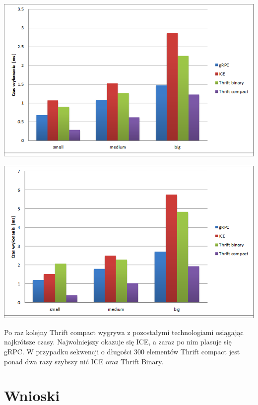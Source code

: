 \documentclass[12pt]{article}
\begin{document}
\begin{center}
\centering
    \includegraphics{lan_seq100.png}
\end{center}
\begin{center}
\centering
    \includegraphics{lan_seq1000.png}
\end{center}

Po raz kolejny Thrift compact wygrywa z pozostałymi technologiami osiągając najkrótsze czasy. Najwolniejszy okazuje się ICE, a zaraz po nim plasuje się gRPC. W przypadku sekwencji o długości 300 elementów Thrift compact jest ponad dwa razy szybszy nić ICE oraz Thrift Binary.


\section{Wnioski}
\end{document}
